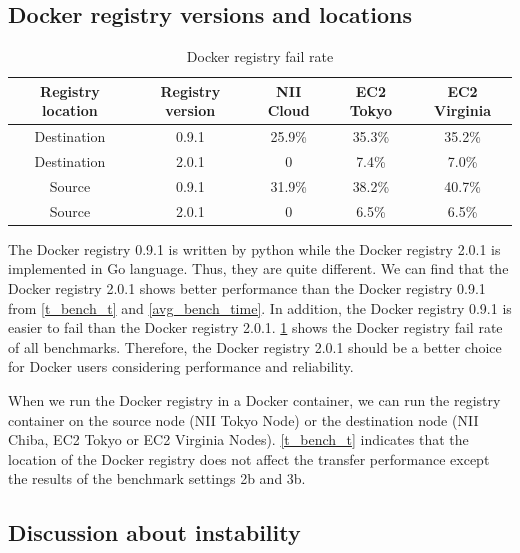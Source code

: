 \documentclass{ieicej}
\begin{document}
\subsection{Docker registry versions and locations}

\begin{table}[ht]
  \begin{tabular}{|c|c|c|c|c|}
\hline
Registry location & Registry version & NII Cloud & EC2 Tokyo & EC2 Virginia \\
\hline
Destination       & 0.9.1            & 25.9\%     & 35.3\% & 35.2\% \\
\hline
Destination       & 2.0.1            & 0         & 7.4\%  & 7.0\% \\
\hline
Source            &  0.9.1           & 31.9\%     & 38.2\% & 40.7\% \\
\hline
Source            &  2.0.1           & 0         & 6.5\%  & 6.5\% \\
\hline
  \end{tabular}
  \caption{Docker registry fail rate}
  \label{reg_fail_rate}
\end{table}


The Docker registry 0.9.1 is written by python while the Docker registry 2.0.1 is implemented in Go language.
Thus, they are quite different. We can find that the Docker registry 2.0.1 shows better performance than the Docker registry 0.9.1 from \cref{t_bench_t} and \cref{avg_bench_time}.
In addition, the Docker registry 0.9.1 is easier to fail than the Docker registry 2.0.1.
\cref{reg_fail_rate} shows the Docker registry fail rate of all benchmarks. Therefore, the Docker registry 2.0.1 should be a better choice for Docker users considering performance and reliability.

When we run the Docker registry in a Docker container, we can run the registry container on the source node (NII Tokyo Node) or the destination node (NII Chiba, EC2 Tokyo or EC2 Virginia Nodes).
\cref{t_bench_t} indicates that the location of the Docker registry does not affect the transfer performance except the results of the benchmark settings 2b and 3b.

\subsection{Discussion about instability}
\end{document}
